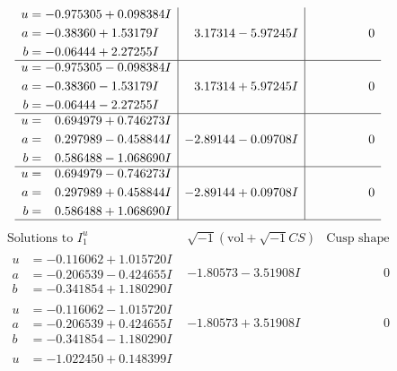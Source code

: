 \documentclass[1p]{elsarticle_modified}
\theoremstyle{definition}
\newcommand{\I}{\sqrt{-1}}
\begin{document}
$$\begin{array}{c|c|c}
\begin{aligned}
u &= -0.975305 + 0.098384 I \\
a &= -0.38360 + 1.53179 I \\
b &= -0.06444 + 2.27255 I\end{aligned}
 & \phantom{-}3.17314 - 5.97245 I & \phantom{-0.000000 } 0 \\ \hline\begin{aligned}
u &= -0.975305 - 0.098384 I \\
a &= -0.38360 - 1.53179 I \\
b &= -0.06444 - 2.27255 I\end{aligned}
 & \phantom{-}3.17314 + 5.97245 I & \phantom{-0.000000 } 0 \\ \hline\begin{aligned}
u &= \phantom{-}0.694979 + 0.746273 I \\
a &= \phantom{-}0.297989 - 0.458844 I \\
b &= \phantom{-}0.586488 - 1.068690 I\end{aligned}
 & -2.89144 - 0.09708 I & \phantom{-0.000000 } 0 \\ \hline\begin{aligned}
u &= \phantom{-}0.694979 - 0.746273 I \\
a &= \phantom{-}0.297989 + 0.458844 I \\
b &= \phantom{-}0.586488 + 1.068690 I\end{aligned}
 & -2.89144 + 0.09708 I & \phantom{-0.000000 } 0\\
 \hline 
 \end{array}$$\newpage$$\begin{array}{c|c|c}  
\text{Solutions to }I^u_{1}& \I (\text{vol} + \sqrt{-1}CS) & \text{Cusp shape}\\
 \hline 
\begin{aligned}
u &= -0.116062 + 1.015720 I \\
a &= -0.206539 - 0.424655 I \\
b &= -0.341854 + 1.180290 I\end{aligned}
 & -1.80573 - 3.51908 I & \phantom{-0.000000 } 0 \\ \hline\begin{aligned}
u &= -0.116062 - 1.015720 I \\
a &= -0.206539 + 0.424655 I \\
b &= -0.341854 - 1.180290 I\end{aligned}
 & -1.80573 + 3.51908 I & \phantom{-0.000000 } 0 \\ \hline\begin{aligned}
u &= -1.022450 + 0.148399 I \\

\end{aligned}
\end{array}$$
\end{document}
